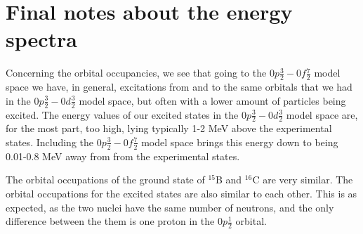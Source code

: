 





\section{Final notes about the energy spectra}

Concerning the orbital occupancies, we see that going to the
$0p\frac32-0f\frac72$ model space we have, in general, excitations from and to
the same orbitals that we had in the $0p\frac32-0d\frac32$ model space, but often
with a lower amount of particles being excited. The energy values of our
excited states in the $0p\frac32-0d\frac32$ model space are, for the most part,
too high, lying typically 1-2 MeV above the experimental states. Including the
$0p\frac32-0f\frac72$ model space brings this energy down to being 0.01-0.8 MeV
away from from the experimental states.


The orbital occupations of the ground state of $^{15}$B and $^{16}$C are very
similar. The orbital occupations for the excited states are also similar to
each other. This is as expected, as the two nuclei have the same number of
neutrons, and the only difference between the them is one proton in the
$0p\frac12$ orbital.


